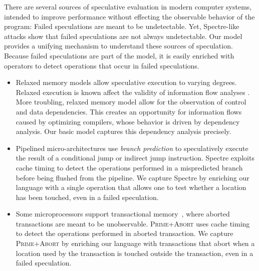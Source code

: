 There are several sources of speculative evaluation in modern computer
systems, intended to improve performance without effecting the observable
behavior of the program: Failed speculations are meant to be
undetectable. Yet, Spectre-like attacks show that failed speculations are not
always undetectable.  Our model provides a unifying mechanism to understand
these sources of speculation.  Because failed speculations are part of the
model, it is easily enriched with operators to detect operations that occur
in failed speculations.
\begin{itemize}
\item Relaxed memory models
  \cite{SparcV9,Manson:2005:JMM:1047659.1040336,Boehm:2008:FCC:1375581.1375591,DBLP:conf/popl/ZhaoNMZ12}
  allow speculative execution to varying degrees. Relaxed execution
  is known affect the validity of information flow analyses
  \cite{6957104,Vaughan:2012:SIF}.  More troubling, relaxed memory model
  allow for the observation of control and data dependencies. This creates an
  opportunity for information flows caused by optimizing compilers, whose
  behavior is driven by dependency analysis.  Our basic model captures this
  dependency analysis precisely.
\item Pipelined micro-architectures use \emph{branch prediction}
  to speculatively execute the result of
  a conditional jump or indirect jump instruction.
  Spectre \cite{DBLP:journals/corr/abs-1801-01203} exploits
  cache timing to detect the operations performed in a mispredicted branch
  before being flushed from the pipeline.  We capture Spectre by enriching
  our language with a single operation that allows one to test whether a
  location has been touched, even in a failed speculation.
\item Some microprocessors support transactional
  memory~\cite{ChongSW18}, where aborted transactions are meant to be
  unobservable.  \textsc{Prime+Abort}
  \cite{DBLP:conf/uss/DisselkoenKPT17} uses cache timing to detect the
  operations performed in aborted transaction.  We capture \textsc{Prime+Abort} by enriching
  our language with transactions that abort when a location used by the
  transaction is touched outside the transaction, even in a failed speculation.
\end{itemize}

